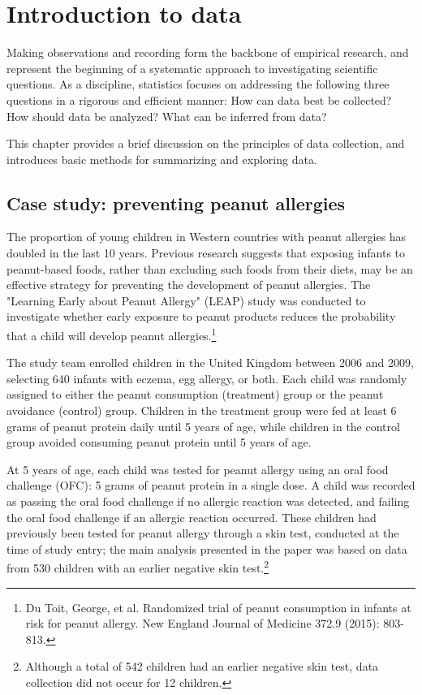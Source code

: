 

\chapter{Introduction to data}
\label{introductionToData}

Making observations and recording  form the backbone of empirical research, and represent the beginning of a systematic approach to investigating scientific questions. As a discipline, statistics focuses on addressing the following three questions in a rigorous and efficient manner: How can data best be collected? How should data be analyzed? What can be inferred from data?

This chapter provides a brief discussion on the principles of data collection, and introduces basic methods for summarizing and exploring data. 

\section[Case study]{Case study: preventing peanut allergies}
\label{leapCaseStudy}


The proportion of young children in Western countries with peanut allergies has doubled in the last 10 years. Previous research suggests that exposing infants to peanut-based foods, rather than excluding such foods from their diets, may be an effective strategy for preventing the development of peanut allergies. The "Learning Early about Peanut Allergy" (LEAP) study was conducted to investigate whether early exposure to peanut products reduces the probability that a child will develop peanut allergies.\footnote{Du Toit, George, et al. Randomized trial of peanut consumption in infants at risk for peanut allergy. New England Journal of Medicine 372.9 (2015): 803-813.}

The study team enrolled children in the United Kingdom between 2006 and 2009, selecting 640 infants with eczema, egg allergy, or both. Each child was randomly assigned to either the peanut consumption (treatment) group or the peanut avoidance (control) group. Children in the treatment group were fed at least 6 grams of peanut protein daily until 5 years of age, while children in the control group avoided consuming peanut protein until 5 years of age.

At 5 years of age, each child was tested for peanut allergy using an oral food challenge (OFC): 5 grams of peanut protein in a single dose. A child was recorded as passing the oral food challenge if no allergic reaction was detected, and failing the oral food challenge if an allergic reaction occurred. These children had previously been tested for peanut allergy through a skin test, conducted at the time of study entry; the main analysis presented in the paper was based on data from 530 children with an earlier negative skin test.\footnote{Although a total of 542 children had an earlier negative skin test, data collection did not occur for 12 children.} 

